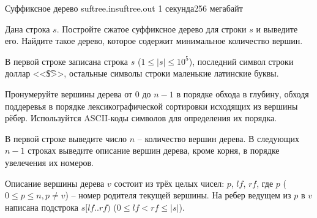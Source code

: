
\begin{problem}{Суффиксное дерево}
{suftree.in}{suftree.out}
{1 секунда}{256 мегабайт}{}

Дана строка $s$. Постройте сжатое суффиксное дерево для строки $s$ и выведите его.
Найдите такое дерево, которое содержит минимальное количество вершин.

\InputFile

В первой строке записана строка $s$ ($1 \le |s| \le 10^5$),
последний символ строки доллар <<\t{\$}>>, остальные символы строки маленькие латинские буквы.

\OutputFile

Пронумеруйте вершины дерева от $0$ до $n-1$ в порядке обхода в глубину, обходя поддеревья в порядке
лексикографической сортировки исходящих из вершины рёбер. Используйтся ASCII-коды символов для
определения их порядка.

В первой строке выведите число $n$ -- количество вершин дерева. В следующих $n-1$ 
строках выведите описание вершин дерева, кроме корня, в порядке увелечения их номеров.

Описание вершины дерева $v$ состоит из трёх целых чисел: $p$, $lf$, $rf$, где $p$ ($0 \le p \le n, p \not= v$) --
номер родителя текущей вершины. На ребер ведущем из $p$ в $v$ написана подстрока $s[lf..rf)$ ($0 \le lf < rf \le |s|$).

\Examples

\begin{example}
%
%
%
\end{example}

\end{problem}
